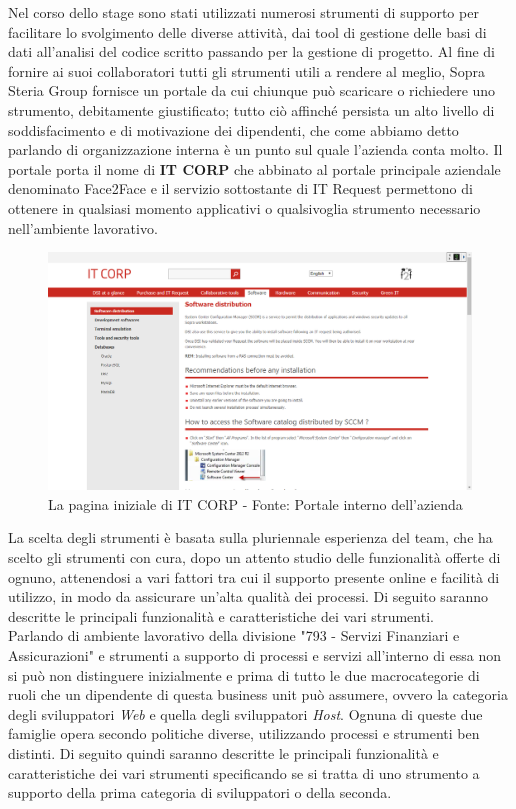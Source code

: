 	Nel corso dello stage sono stati utilizzati numerosi strumenti di supporto per facilitare lo svolgimento delle diverse attività, dai tool di gestione delle basi di dati all'analisi del codice scritto passando per la gestione di progetto. Al fine di fornire ai suoi collaboratori tutti gli strumenti utili a rendere al meglio, Sopra Steria Group fornisce un portale da cui chiunque può scaricare o richiedere uno strumento, debitamente giustificato; tutto ciò affinché persista un alto livello di soddisfacimento e di motivazione dei dipendenti, che come abbiamo detto parlando di organizzazione interna è un punto sul quale l'azienda conta molto. Il portale porta il nome di \textbf{IT CORP} che abbinato al portale principale aziendale denominato Face2Face e il servizio sottostante di IT Request permettono di ottenere in qualsiasi momento applicativi o qualsivoglia strumento necessario nell'ambiente lavorativo.

	\begin{figure}[H]
		\centering
	   	\includegraphics[width=1\textwidth]{immagini/ITCorp}
	   	\caption{La pagina iniziale di IT CORP - Fonte: Portale interno dell'azienda}
	\end{figure}
	
	La scelta degli strumenti è basata sulla pluriennale esperienza del team, che ha scelto gli strumenti con cura, dopo un attento studio delle funzionalità offerte di ognuno, attenendosi a vari fattori tra cui il supporto presente online e facilità di utilizzo, in modo da assicurare un'alta qualità dei processi. Di seguito saranno descritte le principali funzionalità e caratteristiche dei vari strumenti.\\

	Parlando di ambiente lavorativo della divisione "793 - Servizi Finanziari e Assicurazioni" e strumenti a supporto di processi e servizi all'interno di essa non si può non distinguere inizialmente e prima di tutto le due macrocategorie di ruoli che un dipendente di questa business unit può assumere, ovvero la categoria degli sviluppatori \textit{Web} e quella degli sviluppatori \textit{Host}. Ognuna di queste due famiglie opera secondo politiche diverse, utilizzando processi e strumenti ben distinti. Di seguito quindi saranno descritte le principali funzionalità e caratteristiche dei vari strumenti specificando se si tratta di uno strumento a supporto della prima categoria di sviluppatori o della seconda.
	
